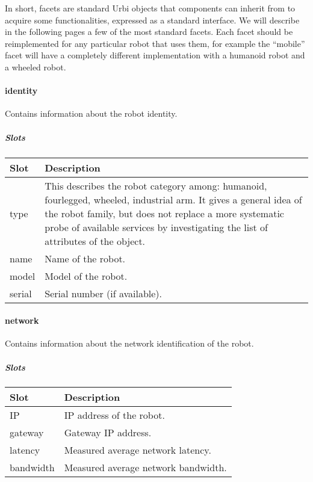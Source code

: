 \documentclass[a4paper]{article}
\begin{document}
In short, facets are standard Urbi objects that components can inherit
from to acquire some functionalities, expressed as a standard
interface. We will describe in the following pages a few of the most
standard facets. Each facet should be reimplemented for any particular
robot that uses them, for example the “mobile” facet will have a
completely different implementation with a humanoid robot and a wheeled
robot.

\paragraph{identity}


Contains information about the robot identity.

\subparagraph{Slots}

\begin{flushleft}
\tablehead{}
\begin{supertabular}{|m{2.8669999cm}|m{12.472cm}|}
\hline
\sffamily\bfseries Slot &
\sffamily\bfseries Description\\\hline
type &
\sffamily This describes the robot category
among: humanoid, fourlegged, wheeled, industrial arm. It gives a
general idea of the robot family, but does not replace a more
systematic probe of available services by investigating the list of
attributes of the object.\\\hline
name &
\sffamily Name of the robot.\\\hline
model &
\sffamily Model of the robot.\\\hline
serial &
\sffamily Serial number (if available).\\\hline
\end{supertabular}
\end{flushleft}
\paragraph{network}


Contains information about the network identification of the robot.

\subparagraph{Slots}

\begin{flushleft}
\tablehead{}
\begin{supertabular}{|m{2.8669999cm}|m{12.422cm}|}
\hline
\sffamily\bfseries Slot &
\sffamily\bfseries Description\\\hline
IP &
\sffamily IP address of the robot.\\\hline
gateway &
\sffamily Gateway IP address.\\\hline
latency &
\sffamily Measured average network
latency.\\\hline
bandwidth &
\sffamily Measured average network
bandwidth.\\\hline
\end{supertabular}
\end{flushleft}
\end{document}
